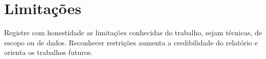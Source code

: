 \section{Limitações}

Registre com honestidade as limitações conhecidas do trabalho, sejam técnicas,
de escopo ou de dados. Reconhecer restrições aumenta a credibilidade do
relatório e orienta os trabalhos futuros.

